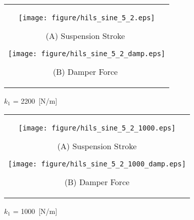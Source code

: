 \documentclass[a4paper,12pt]{article_vdlab_sotsuron}
\begin{document}
\vspace{10mm}
\begin{figure}[h]
    \begin{tabular}{c}
      \begin{minipage}{0.45\hsize}
	\begin{center}
	  \texttt{[image: figure/hils\_sine\_5\_2.eps]}
	\end{center}
	\begin{center}
	  \vspace{2mm}
	  \ (A) Suspension Stroke \
	  \end{center}
      \end{minipage}
      \begin{minipage}{0.5\hsize}
	\begin{center}
	  \texttt{[image: figure/hils\_sine\_5\_2\_damp.eps]}
	\end{center}
	\begin{center}
	  \vspace{2mm}
	  \ (B) Damper Force \
	  \end{center}
      \end{minipage}
    \end{tabular}
    \vspace{2mm}
    \caption{$k_1$ = 2200~[N/m]}
    \label{fig:5_2_2200}
\end{figure}
\vspace{10mm}
\begin{figure}[h]
    \begin{tabular}{c}
      \begin{minipage}{0.45\hsize}
	\begin{center}
	  \texttt{[image: figure/hils\_sine\_5\_2\_1000.eps]}
	\end{center}
	\begin{center}
	  \vspace{2mm}
	  \ (A) Suspension Stroke\
	  \end{center}
      \end{minipage}
      \begin{minipage}{0.5\hsize}
	\begin{center}
	  \texttt{[image: figure/hils\_sine\_5\_2\_1000\_damp.eps]}
	\end{center}
	\begin{center}
	  \vspace{2mm}
	  \ (B) Damper Force\
	  \end{center}
      \end{minipage}
    \end{tabular}
    \vspace{2mm}
    \caption{$k_1$ = 1000~[N/m]}
    \label{fig:5_2_1000}
\end{figure}
\end{document}
